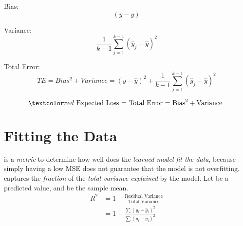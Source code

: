\documentclass[
	exam={Midterm}
]{cs584exam}
\begin{document}
Bias:
\begin{equation}
(y - \hat{y})
	\label{eq:bias}
\end{equation}

Variance:
\begin{equation}
	\frac{1}{k-1} \sum_{j=1}^{k-1} \left( \hat{y}_{j} - \hat{y} \right)^{2}
	\label{eq:variance}
\end{equation}

Total Error:
\begin{equation}
	TE = Bias^{2} + Variance = (y - \hat{y})^{2} + \frac{1}{k-1} \sum_{j=1}^{k-1} \left( \hat{y}_{j} - \hat{y} \right)^{2}
	\label{eq:total-error}
\end{equation}

\[ \data{ \mbox{ Expected Loss = Total Error = Bias}^{2} + \mbox{Variance } } \]

\section{Fitting the Data}\label{sec:fitting-the-data}
 is a \emph{metric} to determine how well does the \emph{learned model fit the data}, because simply having a low MSE does not guarantee that the model is not overfitting.
 captures the \emph{fraction} of the \emph{total variance explained} by the model.
Let  be a predicted value, and  be the sample mean.
\begin{equation}
	\begin{aligned}
		R^{2} &= 1 - \frac{\mbox{Residual Variance}}{\mbox{Total Variance}}\\
		&= 1 - \frac{\sum (y_{i} - \hat{y}_{i})^{2}}{\sum (y_{i} - \bar{y}_{i})^{2}}
	\end{aligned}
	\label{eq:r2}
\end{equation}
\end{document}
